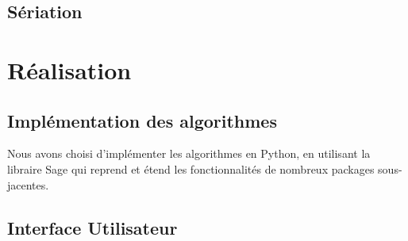 \documentclass[12pt]{article}
\begin{document}
\subsection{S\'{e}riation}

\section{R\'{e}alisation}

\subsection{Implémentation des algorithmes}

Nous avons choisi d'impl\'{e}menter les algorithmes en Python, en utilisant la libraire Sage qui reprend et \'{e}tend les fonctionnalit\'{e}s de nombreux packages sous-jacentes.

\subsection{Interface Utilisateur}
\end{document}
